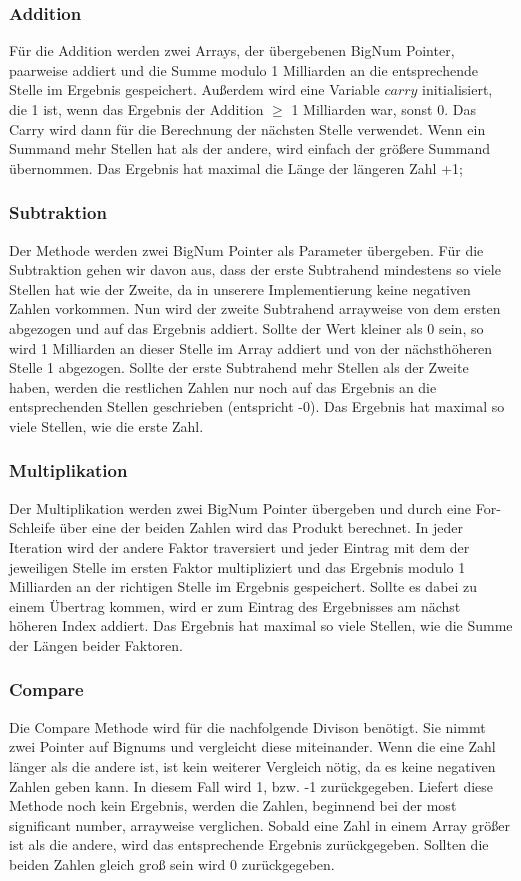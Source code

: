 \documentclass[course=erap]{aspdoc}
\begin{document}
    \subsubsection{Addition}
    Für die Addition werden zwei Arrays, der übergebenen BigNum Pointer, paarweise addiert und die Summe modulo 1 Milliarden an die entsprechende Stelle im Ergebnis gespeichert. Außerdem wird eine Variable $carry$ initialisiert, die 1 ist, wenn das Ergebnis der Addition $\geq$ 1 Milliarden war, sonst 0. Das Carry wird dann für die Berechnung der nächsten Stelle verwendet. Wenn ein Summand mehr Stellen hat als der andere, wird einfach der größere Summand übernommen. Das Ergebnis hat maximal die Länge der längeren Zahl +1;
    \subsubsection{Subtraktion}
    Der Methode werden zwei BigNum Pointer als Parameter übergeben. Für die Subtraktion gehen wir davon aus, dass der erste Subtrahend  mindestens so viele Stellen hat wie der Zweite, da in unserere Implementierung keine negativen Zahlen vorkommen. Nun wird der zweite Subtrahend arrayweise von dem ersten abgezogen und auf das Ergebnis addiert. Sollte der Wert kleiner als 0 sein, so wird 1 Milliarden an dieser Stelle im Array addiert und von der nächsthöheren Stelle 1 abgezogen. Sollte der erste Subtrahend mehr Stellen als der Zweite haben, werden die restlichen Zahlen nur noch auf das Ergebnis an die entsprechenden Stellen geschrieben (entspricht -0). Das Ergebnis hat maximal so viele Stellen, wie die erste Zahl.
    \subsubsection{Multiplikation}
    Der Multiplikation werden zwei BigNum Pointer übergeben und durch eine For-Schleife über eine der beiden Zahlen wird das Produkt berechnet. In jeder Iteration wird der andere Faktor traversiert und jeder Eintrag mit dem der jeweiligen Stelle im ersten Faktor multipliziert und das Ergebnis modulo 1 Milliarden an der richtigen Stelle im Ergebnis gespeichert. Sollte es dabei zu einem Übertrag kommen, wird er zum Eintrag des Ergebnisses am nächst höheren Index addiert. Das Ergebnis hat maximal so viele Stellen, wie die Summe der Längen beider Faktoren.
    \subsubsection{Compare}
    Die Compare Methode wird für die nachfolgende Divison benötigt. Sie nimmt zwei Pointer auf Bignums und vergleicht diese miteinander. Wenn die eine Zahl länger als die andere ist, ist kein weiterer Vergleich nötig, da es keine negativen Zahlen geben kann. In diesem Fall wird 1, bzw. -1 zurückgegeben. Liefert diese Methode noch kein Ergebnis, werden die Zahlen, beginnend bei der \glqq most significant number\grqq, arrayweise verglichen. Sobald eine Zahl in einem Array größer ist als die andere, wird das entsprechende Ergebnis zurückgegeben. Sollten die beiden Zahlen gleich groß sein wird 0 zurückgegeben.
\end{document}
